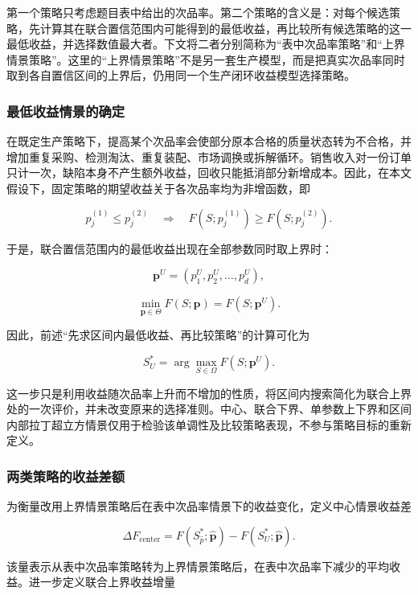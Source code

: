 \documentclass{cumcm}
\numberwithin{figure}{section}
\numberwithin{table}{section}
\begin{document}
第一个策略只考虑题目表中给出的次品率。第二个策略的含义是：对每个候选策略，先计算其在联合置信范围内可能得到的最低收益，再比较所有候选策略的这一最低收益，并选择数值最大者。下文将二者分别简称为``表中次品率策略''和``上界情景策略''。这里的``上界情景策略''不是另一套生产模型，而是把真实次品率同时取到各自置信区间的上界后，仍用同一个生产闭环收益模型选择策略。

\subsubsection{最低收益情景的确定}\label{ux6700ux4f4eux6536ux76caux60c5ux666fux7684ux786eux5b9a}

在既定生产策略下，提高某个次品率会使部分原本合格的质量状态转为不合格，并增加重复采购、检测淘汰、重复装配、市场调换或拆解循环。销售收入对一份订单只计一次，缺陷本身不产生额外收益，回收只能抵消部分新增成本。因此，在本文假设下，固定策略的期望收益关于各次品率均为非增函数，即

\[
p_j^{(1)}\leq p_j^{(2)}
\quad\Longrightarrow\quad
F(S;p_j^{(1)})\geq F(S;p_j^{(2)}).
\]

于是，联合置信范围内的最低收益出现在全部参数同时取上界时：

\[
\boldsymbol p^U=(p_1^U,p_2^U,\ldots,p_d^U),
\]

\[
\min_{\boldsymbol p\in\Theta}F(S;\boldsymbol p)
=F(S;\boldsymbol p^U).
\]

因此，前述``先求区间内最低收益、再比较策略''的计算可化为

\[
S_U^*
=\arg\max_{S\in\Omega}F(S;\boldsymbol p^U).
\]

这一步只是利用收益随次品率上升而不增加的性质，将区间内搜索简化为联合上界处的一次评价，并未改变原来的选择准则。中心、联合下界、单参数上下界和区间内部拉丁超立方情景仅用于检验该单调性及比较策略表现，不参与策略目标的重新定义。

\subsubsection{两类策略的收益差额}\label{ux4e24ux7c7bux7b56ux7565ux7684ux6536ux76caux5deeux989d}

为衡量改用上界情景策略后在表中次品率情景下的收益变化，定义中心情景收益差

\[
\Delta F_{\mathrm{center}}=
F(S_{\hat p}^*;\hat{\boldsymbol p})
-F(S_U^*;\hat{\boldsymbol p}).
\]

该量表示从表中次品率策略转为上界情景策略后，在表中次品率下减少的平均收益。进一步定义联合上界收益增量
\end{document}
